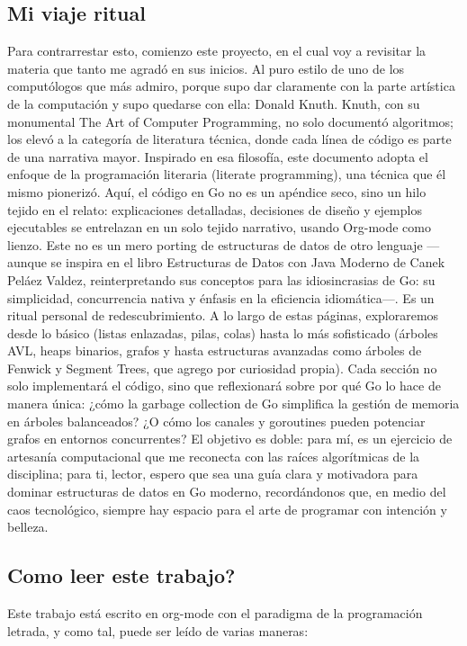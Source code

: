 \documentclass[11pt]{article}
\begin{document}
\subsection{Mi viaje ritual}
\label{sec:org91c8e8f}

Para contrarrestar esto, comienzo este proyecto, en el cual voy a revisitar la materia que tanto me agradó en sus inicios. Al puro estilo de uno de los computólogos que más admiro, porque supo dar claramente con la parte artística de la computación y supo quedarse con ella: Donald Knuth. Knuth, con su monumental The Art of Computer Programming, no solo documentó algoritmos; los elevó a la categoría de literatura técnica, donde cada línea de código es parte de una narrativa mayor. Inspirado en esa filosofía, este documento adopta el enfoque de la programación literaria (literate programming), una técnica que él mismo pionerizó. Aquí, el código en Go no es un apéndice seco, sino un hilo tejido en el relato: explicaciones detalladas, decisiones de diseño y ejemplos ejecutables se entrelazan en un solo tejido narrativo, usando Org-mode como lienzo.
Este no es un mero porting de estructuras de datos de otro lenguaje —aunque se inspira en el libro Estructuras de Datos con Java Moderno de Canek Peláez Valdez, reinterpretando sus conceptos para las idiosincrasias de Go: su simplicidad, concurrencia nativa y énfasis en la eficiencia idiomática—. Es un ritual personal de redescubrimiento. A lo largo de estas páginas, exploraremos desde lo básico (listas enlazadas, pilas, colas) hasta lo más sofisticado (árboles AVL, heaps binarios, grafos y hasta estructuras avanzadas como árboles de Fenwick y Segment Trees, que agrego por curiosidad propia). Cada sección no solo implementará el código, sino que reflexionará sobre por qué Go lo hace de manera única: ¿cómo la garbage collection de Go simplifica la gestión de memoria en árboles balanceados? ¿O cómo los canales y goroutines pueden potenciar grafos en entornos concurrentes?
El objetivo es doble: para mí, es un ejercicio de artesanía computacional que me reconecta con las raíces algorítmicas de la disciplina; para ti, lector, espero que sea una guía clara y motivadora para dominar estructuras de datos en Go moderno, recordándonos que, en medio del caos tecnológico, siempre hay espacio para el arte de programar con intención y belleza.
\subsection{Como leer este trabajo?}
\label{sec:org17e2a61}
Este trabajo está escrito en org-mode con el paradigma de la programación letrada, y como tal, puede ser leído de varias maneras:
\end{document}
